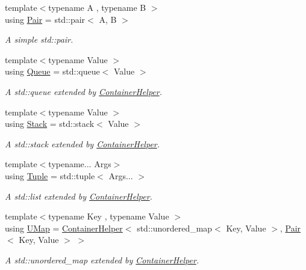 \begin{DoxyCompactItemize}
{\footnotesize template$<$typename A , typename B $>$ }\\using \mbox{\hyperlink{namespaceo_a_a2e4add9f777dcae3f5afde9e90c75b66}{Pair}} = std\+::pair$<$ A, B $>$
\begin{DoxyCompactList}\small\item\em A simple std\+::pair. \end{DoxyCompactList}\item 
{\footnotesize template$<$typename Value $>$ }\\using \mbox{\hyperlink{namespaceo_a_a797c449312e4921e82e3f05a2562bb97}{Queue}} = std\+::queue$<$ Value $>$
\begin{DoxyCompactList}\small\item\em A std\+::queue extended by \mbox{\hyperlink{classo_a_1_1_container_helper}{Container\+Helper}}. \end{DoxyCompactList}\item 
{\footnotesize template$<$typename Value $>$ }\\using \mbox{\hyperlink{namespaceo_a_a992ff8d32ca8c60ad68cbd56834bbeec}{Stack}} = std\+::stack$<$ Value $>$
\begin{DoxyCompactList}\small\item\em A std\+::stack extended by \mbox{\hyperlink{classo_a_1_1_container_helper}{Container\+Helper}}. \end{DoxyCompactList}\item 
{\footnotesize template$<$typename... Args$>$ }\\using \mbox{\hyperlink{namespaceo_a_a9b376768abd013e69cacd776d0356c08}{Tuple}} = std\+::tuple$<$ Args... $>$
\begin{DoxyCompactList}\small\item\em A std\+::list extended by \mbox{\hyperlink{classo_a_1_1_container_helper}{Container\+Helper}}. \end{DoxyCompactList}\item 
{\footnotesize template$<$typename Key , typename Value $>$ }\\using \mbox{\hyperlink{namespaceo_a_a7541113114ad6ecaa07c0228d7e23ed7}{U\+Map}} = \mbox{\hyperlink{classo_a_1_1_container_helper}{Container\+Helper}}$<$ std\+::unordered\+\_\+map$<$ Key, Value $>$, \mbox{\hyperlink{namespaceo_a_a2e4add9f777dcae3f5afde9e90c75b66}{Pair}}$<$ Key, Value $>$ $>$
\begin{DoxyCompactList}\small\item\em A std\+::unordered\+\_\+map extended by \mbox{\hyperlink{classo_a_1_1_container_helper}{Container\+Helper}}. \end{DoxyCompactList}\item 

\end{DoxyCompactItemize}
